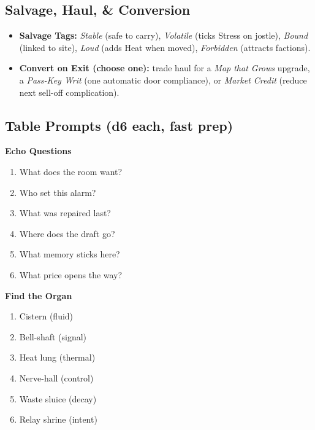 \subsection*{Salvage, Haul, \& Conversion}
\begin{itemize}
  \item \textbf{Salvage Tags:} \emph{Stable} (safe to carry), \emph{Volatile} (ticks Stress on jostle), \emph{Bound} (linked to site), \emph{Loud} (adds Heat when moved), \emph{Forbidden} (attracts factions).
  \item \textbf{Convert on Exit (choose one):} trade haul for a \emph{Map that Grows} upgrade, a \emph{Pass-Key Writ} (one automatic door compliance), or \emph{Market Credit} (reduce next sell-off complication).
\end{itemize}

\subsection*{Table Prompts (d6 each, fast prep)}
\begin{minipage}{0.48\linewidth}
\textbf{Echo Questions}
\begin{enumerate}\item What does the room want?\item Who set this alarm?\item What was repaired last?\item Where does the draft go?\item What memory sticks here?\item What price opens the way?\end{enumerate}
\end{minipage}\hfill
\begin{minipage}{0.48\linewidth}
\textbf{Find the Organ}
\begin{enumerate}\item Cistern (fluid)\item Bell-shaft (signal)\item Heat lung (thermal)\item Nerve-hall (control)\item Waste sluice (decay)\item Relay shrine (intent)\end{enumerate}
\end{minipage}

